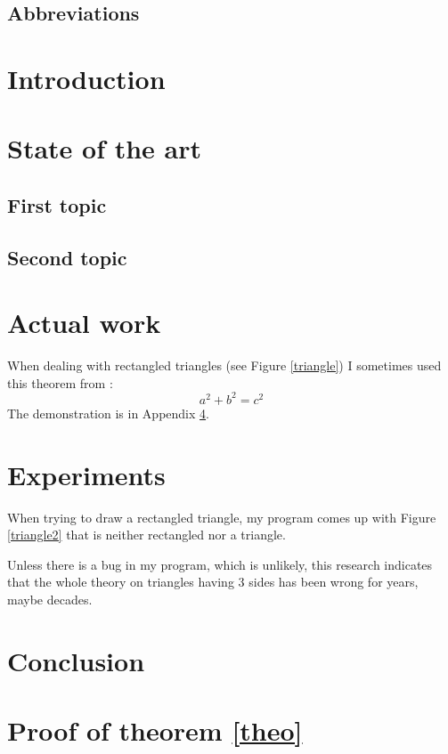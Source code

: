 \documentclass{report}
\begin{document}
 \newpage
 
  \section*{Abbreviations}
 
 \newpage
 
 \listoffigures
 
\listoftables
 
 \tableofcontents
 
 
 \chapter*{Introduction}
 
 
 \chapter{State of the art}
 
 \section{First topic}
 
 \section{Second topic}
 
 \chapter{Actual work}
  
 
 When dealing with rectangled triangles (see Figure \ref{triangle}) I sometimes used this theorem from \cite{pythm001}:
 \begin{equation}\label{theo}
  a^2 + b^2 = c^2
 \end{equation}The demonstration is in Appendix \ref{sec:prooftheorem}.
 
 
 \chapter{Experiments}
 
 When trying to draw a rectangled triangle, my program comes up with Figure \ref{triangle2} that is neither rectangled nor a triangle.
 
Unless there is a bug in my program, which is unlikely, this research indicates that the whole theory on triangles having 3 sides has been wrong for years, maybe decades.
 
 
 \chapter*{Conclusion}
 
 \appendix	
 
 \chapter{Proof of theorem \ref{theo}}
 \label{sec:prooftheorem}
 
 
 

 
 
 
 
 
 
 
\end{document}
